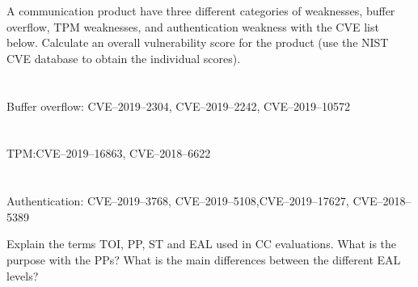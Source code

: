 \begin{questions}
\question{} A communication product have three different categories of weaknesses, buffer overflow, TPM weaknesses, and authentication weakness with the CVE list below. Calculate an overall vulnerability score for the product (use the NIST CVE database to obtain the individual scores).
  \begin{parts}
  \part{} Buffer overflow: CVE--2019--2304, CVE--2019--2242, CVE--2019--10572
  \part{} TPM:\@ CVE--2019--16863, CVE--2018--6622
  \part{} Authentication: CVE--2019--3768, CVE--2019--5108,CVE--2019--17627, CVE--2018--5389
  \end{parts}

\question{} Explain the terms TOI, PP, ST and EAL used in CC evaluations.
\question{} What is the purpose with the PPs?
\question{} What is the main differences between the different EAL levels?
\end{questions}

